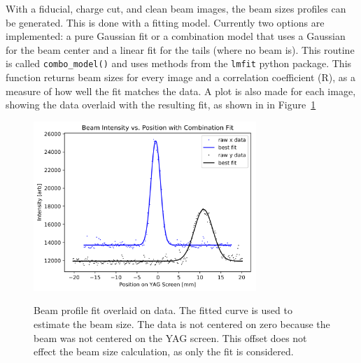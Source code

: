 With a fiducial, charge cut, and clean beam images, the beam sizes profiles can be generated.
This is done with a fitting model. Currently two options are implemented:
a pure Gaussian fit or a combination model that uses a Gaussian for 
the beam center and a linear fit for the tails (where no beam is).
This routine is called \verb|combo_model()| and uses methods from 
the \verb|lmfit| python package.
This function returns beam sizes for every image and 
a correlation coefficient (R), as a measure of how well the fit matches the data. 
A plot is also made for each image, showing the data overlaid with 
the resulting fit, as shown in in Figure~\ref{fig:combo}
\begin{figure}
	\centering
	\includegraphics[width=0.75\textwidth]{images/combomodel}
	\label{fig:combo}
	\caption{Beam profile fit overlaid on data. 
		The fitted curve is used to estimate the beam size.
	The data is not centered on zero because the beam was not centered on the YAG screen.
	This offset does not effect the beam size calculation, as only the fit is considered.}
\end{figure}

